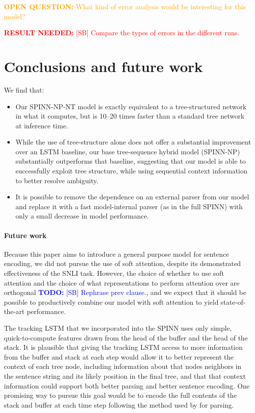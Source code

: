 \documentclass[11pt]{article}
\newcommand\todo[1]{\textcolor{blue}{\textbf{TODO:} #1}}
\newcommand\result[1]{\textcolor{red}{\textbf{RESULT NEEDED:} #1}}
\newcommand\question[1]{\textcolor{orange}{\textbf{OPEN QUESTION:} #1}}
\begin{document}
\question{What kind of error analysis would be interesting for this model?}

\result{[SB] Compare the types of errors in the different runs.}

\vspace{10em}

\section{Conclusions and future work}

We find that:
\begin{itemize}
\item Our SPINN-NP-NT model is exactly equivalent to a tree-structured network in what it computes, but is 10--20 times faster than a standard tree network at inference time.
\item While the use of tree-structure alone does not offer a substantial improvement over an LSTM baseline, our base tree-sequence hybrid model (SPINN-NP) substantially outperforms that baseline, suggesting that our model is able to successfully exploit tree structure, while using sequential context information to better resolve ambiguity.
\item It is possible to remove the dependence on an external parser from our model and replace it with a fast model-internal parser (as in the full SPINN) with only a small decrease in model performance.
\end{itemize}

\paragraph{Future work} Because this paper aims to introduce a general purpose model for sentence encoding, we did not pursue the use of soft attention, despite its demonstrated effectiveness of the SNLI task. However, the choice of whether to use soft attention and the choice of what representations to perform attention over are orthogonal \todo{[SB] Rephrase prev clause.}, and we expect that it should be possible to productively combine our model with soft attention to yield state-of-the-art performance.

The tracking LSTM that we incorporated into the SPINN uses only simple, quick-to-compute features drawn from the head of the buffer and the head of the stack. It is plausible that giving the tracking LSTM access to more information from the buffer and stack at each step would allow it to better represent the context of each tree node, including information about that nodes neighbors in the sentence string and its likely position in the final tree, and that that context information could support both better parsing and better sentence encoding. One promising way to pursue this goal would be to encode the full contents of the stack and buffer at each time step following the method used by \citet{dyer-EtAl:2015:ACL-IJCNLP} for parsing.
\end{document}
